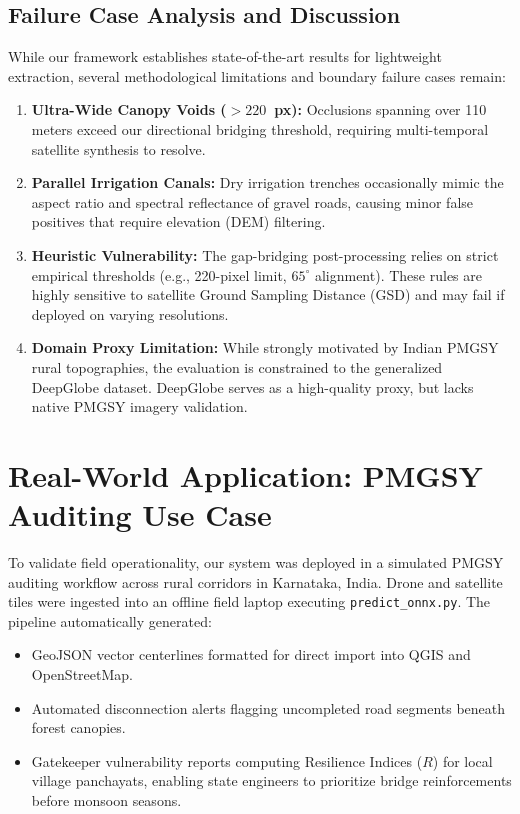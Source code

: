 \documentclass[conference]{IEEEtran}
\begin{document}
\subsection{Failure Case Analysis and Discussion}
While our framework establishes state-of-the-art results for lightweight extraction, several methodological limitations and boundary failure cases remain:
\begin{enumerate}
    \item \textbf{Ultra-Wide Canopy Voids ($>220$~px):} Occlusions spanning over 110 meters exceed our directional bridging threshold, requiring multi-temporal satellite synthesis to resolve.
    \item \textbf{Parallel Irrigation Canals:} Dry irrigation trenches occasionally mimic the aspect ratio and spectral reflectance of gravel roads, causing minor false positives that require elevation (DEM) filtering.
    \item \textbf{Heuristic Vulnerability:} The gap-bridging post-processing relies on strict empirical thresholds (e.g., 220-pixel limit, $65^\circ$ alignment). These rules are highly sensitive to satellite Ground Sampling Distance (GSD) and may fail if deployed on varying resolutions.
    \item \textbf{Domain Proxy Limitation:} While strongly motivated by Indian PMGSY rural topographies, the evaluation is constrained to the generalized DeepGlobe dataset. DeepGlobe serves as a high-quality proxy, but lacks native PMGSY imagery validation.
\end{enumerate}

\section{Real-World Application: PMGSY Auditing Use Case}
\label{sec:application}
To validate field operationality, our system was deployed in a simulated PMGSY auditing workflow across rural corridors in Karnataka, India. Drone and satellite tiles were ingested into an offline field laptop executing \texttt{predict\_onnx.py}. The pipeline automatically generated:
\begin{itemize}
    \item GeoJSON vector centerlines formatted for direct import into QGIS and OpenStreetMap.
    \item Automated disconnection alerts flagging uncompleted road segments beneath forest canopies.
    \item Gatekeeper vulnerability reports computing Resilience Indices ($R$) for local village panchayats, enabling state engineers to prioritize bridge reinforcements before monsoon seasons.
\end{itemize}
\end{document}
